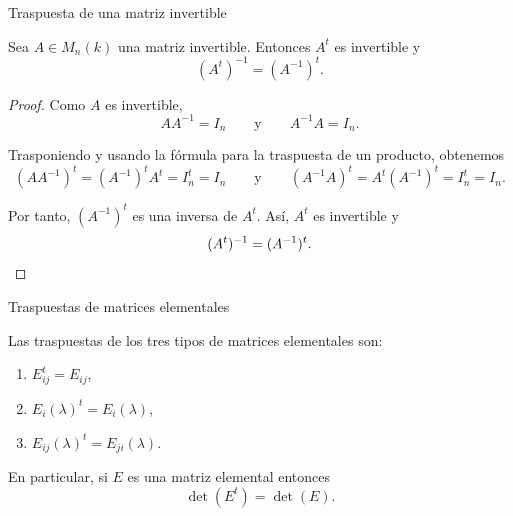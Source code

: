 \begin{frame}{Traspuesta de una matriz invertible}

\begin{corollary}
Sea \(A\in M_n(k)\) una matriz invertible. Entonces \(A^t\) es
invertible y
\[
(A^t)^{-1}=(A^{-1})^t.
\]
\end{corollary}

\begin{proof}
Como \(A\) es invertible,
\[
AA^{-1}=I_n
\qquad\text{y}\qquad
A^{-1}A=I_n.
\]

Trasponiendo y usando la fórmula para la traspuesta de un producto,
obtenemos
\[
(AA^{-1})^t=(A^{-1})^tA^t =I_n^t=I_n
\qquad\text{y}\qquad
(A^{-1}A)^t=A^t(A^{-1})^t =I_n^t =I_n.
\]

Por tanto, \((A^{-1})^t\) es una inversa de \(A^t\). Así, \(A^t\)
es invertible y
\[
(A^t)^{-1}=(A^{-1})^t.\qedhere
\]
\end{proof}

\end{frame}

\begin{frame}{Traspuestas de matrices elementales}

\begin{proposition}
Las traspuestas de los tres tipos de matrices elementales son:
\begin{enumerate}
	\item $E_{ij}^t=E_{ij}$,
	\item $E_i(\lambda)^t=E_i(\lambda)$,
	\item $E_{ij}(\lambda)^t=E_{ji}(\lambda)$.
\end{enumerate}
En particular, si $E$ es una matriz elemental entonces
\[
\det(E^t)=\det(E).
\]
\end{proposition}

\end{frame}

